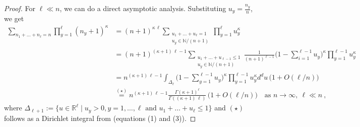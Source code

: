 \documentclass[pdflatex,sn-mathphys-num]{sn-jnl}%
\theoremstyle{thmstyleone}%
\theoremstyle{thmstyletwo}%
\theoremstyle{thmstylethree}%
\begin{document}
\begin{proof} 
For $\ell\ll n$, we can do a direct asymptotic analysis. Substituting $u_y = \frac{n_y}{n}$, we get
	\begin{equation*}
		\begin{aligned}
			\sum_{n_1 + \dots + n_\ell = n}  \prod_{y=1}^\ell (n_y + 1)^\kappa 
			&= (n+1)^{\kappa \, \ell} \sum_{\substack{u_1 + \dots + u_\ell = 1 \\ u_y \in \mathbb{N}/(n+1)}} \prod_{y=1}^\ell u_y^\kappa \\
			&= (n+1)^{(\kappa +1)\,\ell-1} \sum_{\substack{u_1 + \dots + u_{\ell-1} \le 1 \\ u_y \in \mathbb{N}/(n+1)}} \frac{1}{(n+1)^{\ell - 1}} \bigg( 1-\sum_{i=1}^{\ell-1} u_y \bigg)^\kappa \prod_{y=1}^{\ell -1} u_y^\kappa \\
			&= n^{(\kappa +1)\,\ell-1} \int_{\Delta_\ell} \bigg( 1-\sum_{y = 1}^{\ell-1} u_y \bigg)^\kappa \prod_{y=1}^{\ell-1} u_y^\kappa d^d u\,\Big( 1+O(\ell /n)\Big)\\
			&\overset{(\star)}{=}  n^{(\kappa +1)\,\ell-1} \frac{\Gamma(\kappa +1)^\ell}{\Gamma((\kappa +1) \, \ell)}\,\Big( 1+O(\ell /n)\Big)\quad\mbox{as }n\to\infty ,\ \ell\ll n\ ,
		\end{aligned}
	\end{equation*}
	where $\Delta_{\ell+1} := \{u \in \mathbb{R}^{\ell} \mid u_y > 0, y = 1, \dots, \ell\mbox{ and } u_1 + \dots + u_{\ell} \le 1 \}$ and $(\star)$ follows as a Dirichlet integral from \cite{bib_M10} (equations (1) and (3)).
    

\end{proof}
\end{document}
